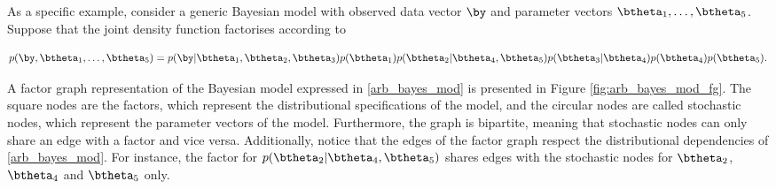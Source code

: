\documentclass[12pt]{article}
\theoremstyle{plain}
\theoremstyle{definition}
\theoremstyle{remark}
\begin{document}
As a specific example,
consider a generic Bayesian model with observed data vector $\by$ and parameter vectors $\btheta_1, \dots,
\btheta_5$. Suppose that the joint density function factorises according to

\begin{equation}
	p (\by, \btheta_1, \dots, \btheta_5) =
		p (\by | \btheta_1, \btheta_2, \btheta_3) p (\btheta_1) p (\btheta_2 | \btheta_4, \btheta_5)
		p (\btheta_3 | \btheta_4) p (\btheta_4) p (\btheta_5).
\label{arb_bayes_mod}
\end{equation}

\noindent A factor graph representation of the Bayesian model expressed in \eqref{arb_bayes_mod} is presented
in Figure \ref{fig:arb_bayes_mod_fg}. The square nodes are the factors, which represent the distributional
specifications of the model, and the circular nodes are called stochastic nodes, which represent the parameter
vectors of the model. Furthermore, the graph is bipartite, meaning that stochastic nodes can only share an
edge with a factor and vice versa. Additionally, notice that the edges of the factor graph respect the distributional
dependencies of \eqref{arb_bayes_mod}. For instance, the factor for $p (\btheta_2 | \btheta_4, \btheta_5)$
shares edges with the stochastic nodes for $\btheta_2$, $\btheta_4$ and $\btheta_5$ only.
\end{document}
